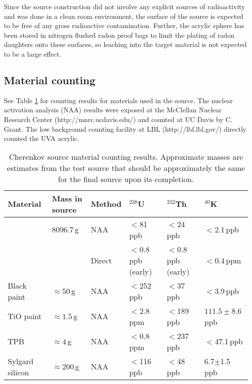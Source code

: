Since the source construction did not involve any explicit sources of radioactivity and was done in a clean room environment, the surface of the source is expected to be free of any gross radioactive contamination. Further, the acrylic sphere has been stored in nitrogen flushed radon proof bags to limit the plating of radon daughters onto these surfaces, so leaching into the target material is not expected to be a large effect.

\subsection{Material counting}
\label{sec:matcounting}
See Table \ref{tab:counting} for counting results for materials used in the source. The nuclear activation analysis (NAA) results were exposed at the McClellan Nuclear Research Center (http://mnrc.ucdavis.edu/) and counted at UC Davis by C. Grant. The low background counting facility at LBL (http://lbf.lbl.gov/) directly counted the UVA acrylic.
\begin{table}[h!]
\centering
\begin{tabular}{|l|l|l|l|l|l|} \hline
                    Material       & Mass in source & Method    & $^{238}$U     & $^{232}$Th    & $^{40}$K      \\ \hline
 \multirow{2}{*}{}  UVA acrylic    & 8096.7\,g & NAA    & $<$81\,ppb    & $<$24\,ppb   & $<$2.1\,ppb   \\ \cline{3-6}
                                   & & Direct & $<$0.8\,ppb (early)&$<$0.8\,ppb (early)& $<$0.4\,ppm \\ \hline
                    Black paint    & $\approx 50$\,g & NAA    & $<$252\,ppb   & $<$37\,ppb   & $<$3.9\,ppb           \\ \hline
                    TiO paint      & $\approx 1.5$\,g & NAA    & $<$2.8\,ppm   & $<$189\,ppb  & $111.5 \pm 8.6$\,ppb           \\ \hline
                    TPB            & $\approx 4$\,g & NAA    & $<$0.8\,ppm   & $<$237\,ppb   & $<$47.1\,ppb  \\ \hline
                    Sylgard silicon& $\approx 200$\,g & NAA    & $<$116\,ppb   & $<$48\,ppb   &6.7$\pm$1.5\,ppb\\ \hline
\end{tabular}
\caption{\label{tab:counting} Cherenkov source material counting results. Approximate masses are estimates from the test source that should be approximately the same for the final source upon its completion.}
\end{table}


